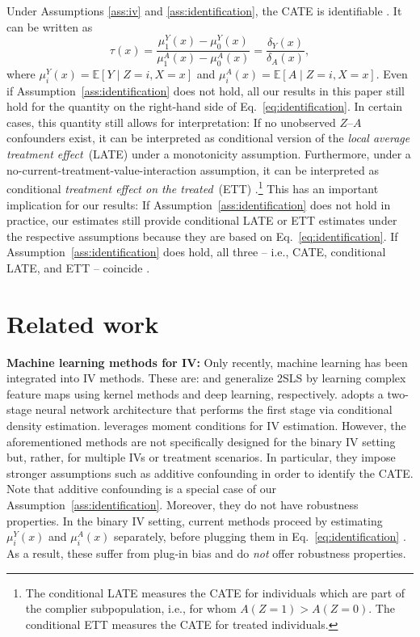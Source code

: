 \documentclass{article} %
\newcommand{\E}{\mathbb{E}}
\theoremstyle{definition}
\theoremstyle{plain}
\begin{document}
Under Assumptions \ref{ass:iv} and \ref{ass:identification}, the CATE is identifiable \citep{Wang.2018}. It can be written as
\begin{equation}
\label{eq:identification}
  \tau(x) = \frac{\mu_1^Y(x) - \mu_0^Y(x)}{\mu_1^A(x) - \mu_0^A(x)} = \frac{\delta_Y(x)}{\delta_A(x)},
\end{equation}
where $\mu_i^Y(x) = \E[Y \mid Z = i, X = x]$ and $\mu_i^A(x) = \E[A \mid Z = i, X = x]$. Even if Assumption~\ref{ass:identification} does not hold, all our results in this paper still hold for the quantity on the right-hand side of Eq.~\eqref{eq:identification}. In certain cases, this quantity still allows for interpretation: If no unobserved $Z$--$A$ confounders exist, it can be interpreted as conditional version of the \emph{local average treatment effect}~(LATE) \citep{Imbens.1994} under a monotonicity assumption. Furthermore, under a no-current-treatment-value-interaction assumption, it can be interpreted as conditional \emph{treatment effect on the treated}~(ETT) \citep{Wang.2018}.\footnote{The conditional LATE measures the CATE for individuals which are part of the complier subpopulation, i.e., for whom $A(Z=1) > A(Z=0)$. The conditional ETT measures the CATE for treated individuals.} This has an important implication for our results: If Assumption~\ref{ass:identification} does not hold in practice, our estimates still provide conditional LATE or ETT estimates under the respective assumptions because they are based on Eq.~\eqref{eq:identification}. If Assumption~\ref{ass:identification} does hold, all three -- i.e., CATE, conditional LATE, and ETT -- coincide \citep{Wang.2018}.

\section{Related work}
\label{sec:related_work}

\textbf{Machine learning methods for IV:}
Only recently, machine learning has been integrated into IV methods. These are: \citet{Singh.2019} and \citet{Xu.2021} generalize 2SLS by learning complex feature maps using kernel methods and deep learning, respectively. \citet{Hartford.2017} adopts a two-stage neural network architecture that performs the first stage via conditional density estimation. \citet{Bennett.2019} leverages moment conditions for IV estimation. However, the aforementioned methods are not specifically designed for the binary IV setting but, rather, for multiple IVs or treatment scenarios. In particular, they impose stronger assumptions such as additive confounding in order to identify the CATE. Note that additive confounding is a special case of our Assumption~\ref{ass:identification}. Moreover, they do not have robustness properties. In the binary IV setting, current methods proceed by estimating $\mu_i^Y(x)$ and $\mu_i^A(x)$ separately, before plugging them in Eq.~\ref{eq:identification} \citep{Imbens.1994, Angrist.1996, BargagliStoffi.2021}. As a result, these suffer from plug-in bias and do \emph{not} offer robustness properties.
\end{document}
